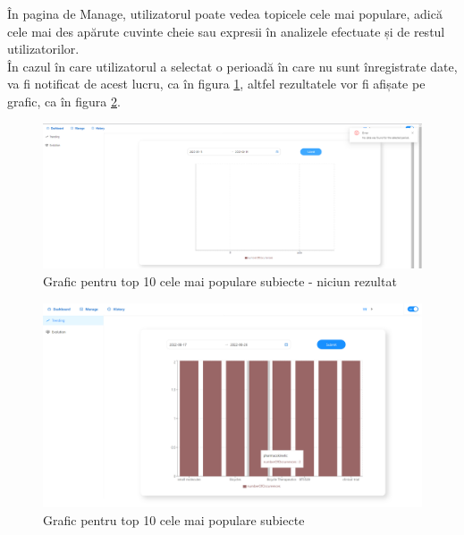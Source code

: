 În pagina de Manage, utilizatorul poate vedea topicele cele mai populare, adică cele mai des apărute cuvinte cheie sau expresii în analizele efectuate și de restul utilizatorilor.\\
În cazul în care utilizatorul a selectat o perioadă în care nu sunt înregistrate date, va fi notificat de acest lucru, ca în figura \ref{fig:trendingNoData}, altfel rezultatele vor fi afișate pe grafic, ca în figura \ref{fig:trending}. 
\begin{figure}[h]
	\centering
	\includegraphics[width=150mm]{figs/trendingNoData.png}
    \caption{Grafic pentru top 10 cele mai populare subiecte - niciun rezultat}
	\label{fig:trendingNoData}
\end{figure}

\begin{figure}[h]
	\centering
	\includegraphics[width=150mm]{figs/trending.png}
    \caption{Grafic pentru top 10 cele mai populare subiecte}
	\label{fig:trending}
\end{figure}

